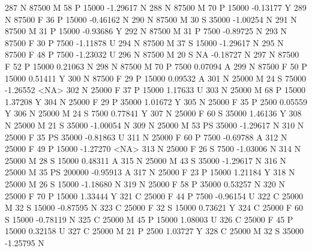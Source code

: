 \documentclass{article}
\begin{document}
\begin{Schunk}
\begin{Soutput}
287       N      87500   M  58         P  15000  -1.29617    N
288       N      87500   M  70         P  15000  -0.13177    Y
289       N      87500   F  36         P  15000  -0.46162    N
290       N      87500   M  30         S  35000  -1.00254    N
291       N      87500   M  31         P  15000  -0.93686    Y
292       N      87500   M  31         P   7500  -0.89725    N
293       N      87500   F  30         P   7500  -1.11878    U
294       N      87500   M  37         S  15000  -1.29617    N
295       N      87500   F  48         P   7500  -1.23032    U
296       N      87500   M  20         S     NA  -0.18727    N
297       N      87500   F  52         P  15000   0.21063    N
298       N      87500   M  70         P   7500   0.07094    A
299       N      87500   F  50         P  15000   0.51411    Y
300       N      87500   F  29         P  15000   0.09532    A
301       N      25000   M  24         S  75000  -1.26552 <NA>
302       N      25000   F  37         P  15000   1.17633    U
303       N      25000   M  68         P  15000   1.37208    Y
304       N      25000   F  29         P  35000   1.01672    Y
305       N      25000   F  35         P   2500   0.05559    Y
306       N      25000   M  24         S   7500   0.77841    Y
307       N      25000   F  60         S  35000   1.46136    Y
308       N      25000   M  21         S  35000  -1.00054    N
309       N      25000   M  53        PS  35000  -1.29617    N
310       N      25000   F  35        PS  35000  -0.81863    U
311       N      25000   F  60         P   7500  -0.69788    A
312       N      25000   F  49         P  15000  -1.27270 <NA>
313       N      25000   F  26         S   7500  -1.03006    N
314       N      25000   M  28         S  15000   0.48311    A
315       N      25000   M  43         S  35000  -1.29617    N
316       N      25000   M  35        PS 200000  -0.95913    A
317       N      25000   F  23         P  15000   1.21184    Y
318       N      25000   M  26         S  15000  -1.18680    N
319       N      25000   F  58         P  35000   0.53257    N
320       N      25000   F  70         P  15000   1.33444    Y
321       C      25000   F  44         P   7500  -0.96154    U
322       C      25000   M  32         S  15000  -0.87595    N
323       C      25000   F  32         S  15000   0.73621    Y
324       C      25000   F  60         S  15000  -0.78119    N
325       C      25000   M  45         P  15000   1.08003    U
326       C      25000   F  45         P  15000   0.32158    U
327       C      25000   M  21         P   2500   1.03727    Y
328       C      25000   M  32         S  35000  -1.25795    N

\end{Soutput}
\end{Schunk}
\end{document}
